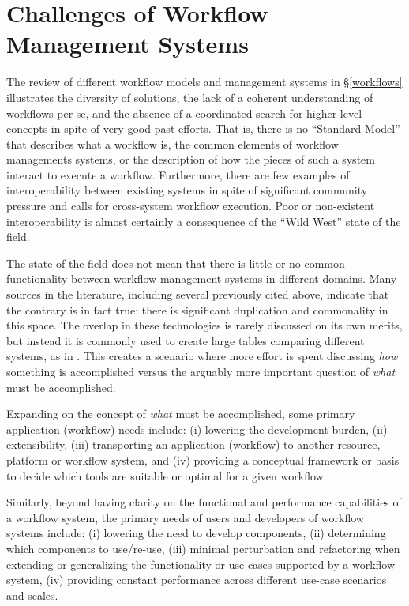 
\section{Challenges of Workflow Management Systems}\label{commonFunc}

The review of different workflow models and management systems in
\S\ref{workflows} illustrates the diversity of solutions, the lack of a coherent
understanding of workflows per se, and the absence of a coordinated search for
higher level concepts in spite of very good past efforts. That is, there is no
``Standard Model'' that describes what a workflow is, the common elements of
workflow managements systems, or the description of how the pieces of such a
system interact to execute a workflow. Furthermore, there are few examples of
interoperability between existing systems in spite of significant community
pressure and calls for cross-system workflow execution. Poor or non-existent
interoperability is almost certainly a consequence of the ``Wild West'' state of
the field.

The state of the field does not mean that there is little or no common
functionality between workflow management systems in different domains. Many
sources in the literature, including several previously cited above, indicate
that the contrary is in fact true: there is significant duplication and
commonality in this space. The overlap in these technologies is rarely discussed
on its own merits, but instead it is commonly used to create large tables
comparing different systems, as in
\cite{ferreira_da_silva_characterization_nodate}. This creates a scenario where
more effort is spent discussing \textit{how} something is accomplished
versus the arguably more important question of \textit{what} must be
accomplished. 

Expanding on the concept of \textit{what} must be accomplished, some primary application (workflow) needs include:
(i) lowering the development burden, (ii) extensibility, (iii) transporting an
application (workflow) to another resource, platform or workflow system, and
(iv) providing a conceptual framework or basis to decide which tools are suitable or optimal for a given workflow.

Similarly, beyond having clarity on the functional and performance capabilities of a
workflow system, the primary needs of users and developers of workflow systems include: (i) lowering the need to develop components, (ii) determining which components
to use/re-use, (iii) minimal perturbation and refactoring when extending or
generalizing the functionality or use cases supported by a workflow system,
(iv) providing constant performance across different use-case scenarios and
scales.

